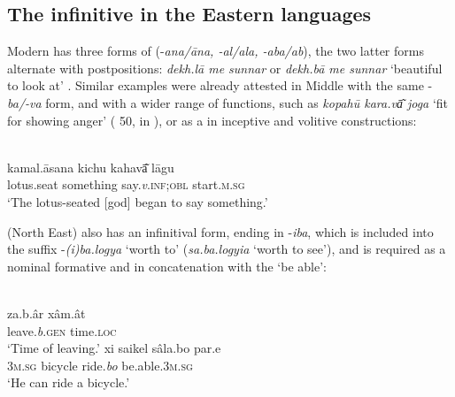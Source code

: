 \documentclass[output=paper]{langsci/langscibook}
\begin{document}
\subsection{The infinitive in the Eastern languages}\label{sec:montaut:4.3}

Modern  has three forms of  (-\textit{ana/āna, -al/ala, -aba/ab}), the two latter forms alternate with postpositions: \textit{dekh.lā me sunnar} or \textit{dekh.bā me sunnar} ‘beautiful to look at’ \citep[519]{Jha1958}. Similar examples were already attested in Middle  with the same -\textit{ba/-va} form, and with a wider range of functions, such as \textit{kopahū kara.vā͂ joga} ‘fit for showing anger’ ( 50, in \citealt[519]{Jha1958}), or as a  in inceptive and volitive constructions:

\ea
\label{ex:montaut:42}
\\
\gll kamal.āsana kichu  kahavā͂        lāgu\\
lotus.seat  something   say.\textit{v}.\textsc{inf;obl}     start.\textsc{m.sg} \\
\glt ‘The lotus-seated [god] began to say something.’ \citep[611]{Jha1958}
\z 

 (North East) also has an infinitival form, ending in -\textit{iba}, which is included into the suffix -\textit{(i)ba.logya} ‘worth to’ (\textit{sa.ba.logyia} ‘worth to see’), and is required as a nominal formative and in concatenation with the  ‘be able’:

\ea\label{ex:montaut:43}
\ea 
{}\\
\gll za.b.âr   xâm.ât\\
leave.\textit{b}.\textsc{gen}   time.\textsc{loc} \\
\glt ‘Time of leaving.’
\ex 
\gll xi  saikel sâla.bo  par.e\\
\textsc{3m.sg}   bicycle    ride.\textit{bo}   be.able.\textsc{3m.sg} \\
\glt ‘He can ride a bicycle.’ \citep[425]{Goswami2003}
\z 
\z 
\end{document}
